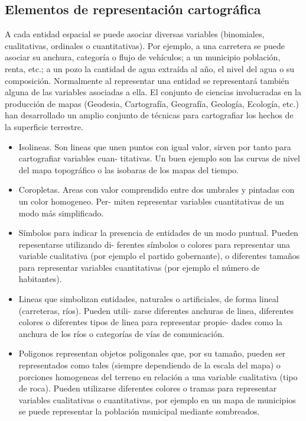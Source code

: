 \subsection{Elementos de representación cartográfica}
A cada entidad espacial se puede asociar diversas variables (binomiales, cualitativas, ordinales o cuantitativas).
Por ejemplo, a una carretera se puede asociar su anchura, categoría o flujo de vehículos; a un municipio población, 
renta, etc.; a un pozo la cantidad de agua extraída al año, el nivel del agua o su composición. Normalmente
al representar una entidad se representará también alguna de las variables asociadas a ella.
El conjunto de ciencias involucradas en la producción de mapas (Geodesia, Cartografía, Geografía, Geología,
Ecología, etc.) han desarrollado un amplio conjunto de técnicas para cartografiar los hechos de la superficie
terrestre.
\begin{itemize}

\item Isolineas. Son lineas que unen puntos con igual valor, sirven por tanto para cartografiar variables cuan-
titativas. Un buen ejemplo son las curvas de nivel del mapa topográfico o las isobaras de los mapas del
tiempo.

\item Coropletas. Areas con valor comprendido entre dos umbrales y pintadas con un color homogeneo. Per-
miten representar variables cuantitativas de un modo más simplificado.

\item Símbolos para indicar la presencia de entidades de un modo puntual. Pueden repesentarse utilizando di-
ferentes símbolos o colores para representar una variable cualitativa (por ejemplo el partido gobernante),
o diferentes tamaños para representar variables cuantitativas (por ejemplo el número de habitantes).

\item Lineas que simbolizan entidades, naturales o artificiales, de forma lineal (carreteras, ríos). Pueden utili-
zarse diferentes anchuras de linea, diferentes colores o diferentes tipos de linea para representar propie-
dades como la anchura de los ríos o categorías de vías de comunicación.

\item Poligonos representan objetos poligonales que, por su tamaño, pueden ser representados como tales
(siempre dependiendo de la escala del mapa) o porciones homogeneas del terreno en relación a una
variable cualitativa (tipo de roca). Pueden utilizarse diferentes colores o tramas para representar variables
cualitativas o cuantitativas, por ejemplo en un mapa de municipios se puede representar la población
municipal mediante sombreados.
\end{itemize}

